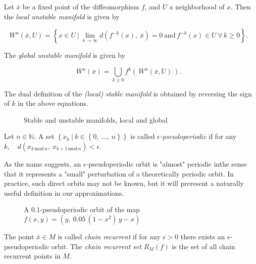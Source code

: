 \begin{definition}
    \cite*{dynbook} Let $\bar{x}$ be a fixed point of the diffeomorphism $f$, and $U$ a neighborhood of $x$. 
    Then the \emph{local unstable manifold} is given by

    \begin{equation}
        W^u(\bar{x}, U) = \left\{x \in U\ \vert\ \lim\limits_{k \to \infty} 
        d(f^{-k}(x),\ \bar{x}) = 0\ \text{and}\ f^{-k}(x) \in U\ \forall\, k \geq 0\right\}.
    \end{equation}

    The \emph{global unstable manifold} is given by

    \begin{equation}
        W^u(\bar{x}) = \bigcup\limits_{k \geq 0} f^k(\,W^u(\bar{x}, U)\,).
    \end{equation}

    The dual definition of the \emph{(local) stable manifold} is obtained by reversing the 
    sign of $k$ in the above equations.
\end{definition}

\begin{figure}[ht]
    \caption{\cite*{dynskript} Stable and unstable manifolds, local and global}
    \label{fig:manifold}    
\end{figure}

\begin{definition}[Pseudoperiodic]
    \cite*{dynbook} Let $n\in \mathbb{N}$. A set 
    $\left\{ x_k\ \vert\ k \in \left\{ 0,\ \dotsc ,\ n \right\} \right\}$ 
    is called \emph{$\epsilon$-pseudoperiodic} if for any
    $k, \quad d(x_{k\, \text{mod}\, n},\ x_{k + 1\, \text{mod}\, n}) < \epsilon$.
\end{definition}

As the name suggests, an $\epsilon$-pseudoperiodic orbit is "almost" periodic inthe sense 
that it represents a "small" perturbation of a theoretically periodic orbit. In practice,
such direct orbits may not be known, but it will preresent a naturally useful definition
in our approximations.

\begin{figure}[ht]
    \caption{\cite*{dynbook} A $0.1$-pseudoperiodic orbit of the map $f(x,y) = (y,\ 0.05\, (1 - x^2)\, y - x)$}
    \label{fig:pseudoperiodic}
\end{figure}

\begin{definition}
    \cite*{dynbook} The point $\bar{x} \in M$ is called \emph{chain recurrent} if for any $\epsilon > 0$ 
    there exists an $\epsilon$-pseudoperiodic orbit. The \emph{chain recurrent set} $R_M(f)$ 
    is the set of all chain recurrent points in $M$.
\end{definition}

